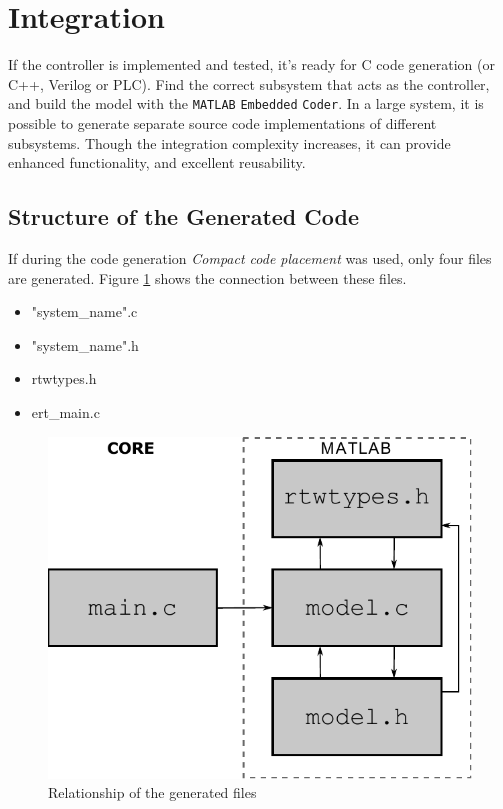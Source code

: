 \section{Integration}
\label{sec:integration}

If the controller is implemented and tested, it's ready for \textsf{C} code generation (or \textsf{C++}, \textsf{Verilog} or \textsf{PLC}). Find the correct subsystem that acts as the controller, and build the model with the \verb!MATLAB! \texttt{Embedded} \verb!Coder!. In a large system, it is possible to generate separate source code implementations of different subsystems. Though the integration complexity increases, it can provide enhanced functionality, and excellent reusability.

\subsection{Structure of the Generated Code}

If during the code generation \emph{Compact code placement} was used, only four files are generated. Figure \ref{fig:rtw} shows the connection between these files. 

\begin{minipage}{0.45\linewidth}
	\begin{itemize}
		\item "system\_name".c
		\item "system\_name".h
		\item rtwtypes.h
		\item ert\_main.c
	\end{itemize}
\end{minipage}
\begin{minipage}{0.45\linewidth}
	\begin{figure}[H]
		\centering
		\includegraphics[width=0.8\linewidth]{img/rtw}
		\caption{Relationship of the generated files}
		\label{fig:rtw}
		\vspace{10pt}
	\end{figure}
\end{minipage}


